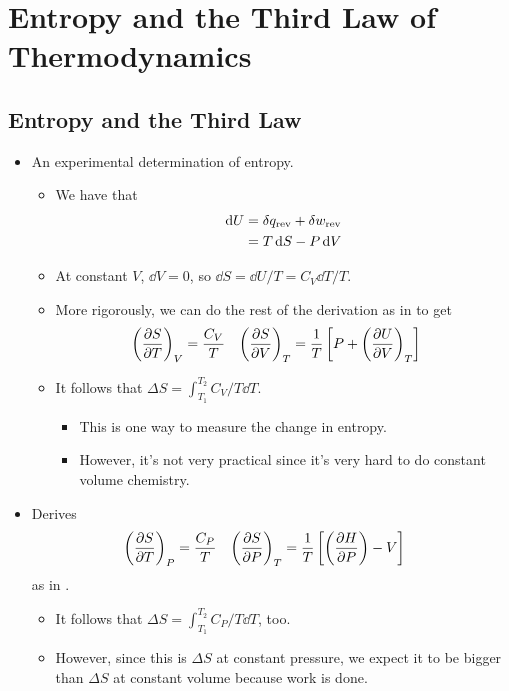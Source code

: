 \documentclass[../notes.tex]{subfiles}
\begin{document}
\chapter{Entropy and the Third Law of Thermodynamics}
\section{Entropy and the Third Law}
\begin{itemize}
    \item {}An experimental determination of entropy.
    \begin{itemize}
        \item We have that
        \begin{align*}
            \dd{U} &= \var{q_\text{rev}}+\var{w_\text{rev}}\\
            &= T\dd{S}-P\dd{V}
        \end{align*}
        \item At constant $V$, $\dd{V}=0$, so $\dd{S}=\dd{U}/T=C_V\dd{T}/T$.
        \item More rigorously, we can do the rest of the derivation as in \textcite{bib:McQuarrieSimon} to get
        \begin{align*}
            \left( \pdv{S}{T} \right)_V &= \frac{C_V}{T}&
            \left( \pdv{S}{V} \right)_T &= \frac{1}{T}\left[ P+\left( \pdv{U}{V} \right)_T \right]
        \end{align*}
        \item It follows that $\Delta S=\int_{T_1}^{T_2}C_V/T\dd{T}$.
        \begin{itemize}
            \item This is one way to measure the change in entropy.
            \item However, it's not very practical since it's very hard to do constant volume chemistry.
        \end{itemize}
    \end{itemize}
    \item Derives
    \begin{align*}
        \left( \pdv{S}{T} \right)_P &= \frac{C_P}{T}&
        \left( \pdv{S}{P} \right)_T &= \frac{1}{T}\left[ \left( \pdv{H}{P} \right)-V \right]
    \end{align*}
    as in \textcite{bib:McQuarrieSimon}.
    \begin{itemize}
        \item It follows that $\Delta S=\int_{T_1}^{T_2}C_P/T\dd{T}$, too.
        \item However, since this is $\Delta S$ at constant pressure, we expect it to be bigger than $\Delta S$ at constant volume because work is done.

\end{itemize}
\end{itemize}
\end{document}
